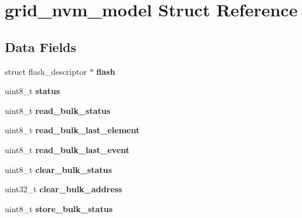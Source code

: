 \hypertarget{structgrid__nvm__model}{\section{grid\-\_\-nvm\-\_\-model Struct Reference}
\label{structgrid__nvm__model}
}
\subsection*{Data Fields}
\begin{DoxyCompactItemize}
\item 
\hypertarget{structgrid__nvm__model_ae7d77cc4c4cc9419b4253b375c141036}{struct flash\-\_\-descriptor $\ast$ {\bfseries flash}}\label{structgrid__nvm__model_ae7d77cc4c4cc9419b4253b375c141036}

\item 
\hypertarget{structgrid__nvm__model_ac6c48387083260cdc1d917ae482636f0}{uint8\-\_\-t {\bfseries status}}\label{structgrid__nvm__model_ac6c48387083260cdc1d917ae482636f0}

\item 
\hypertarget{structgrid__nvm__model_ac22ad810f7fbd10d99898a1b5cdd8c97}{uint8\-\_\-t {\bfseries read\-\_\-bulk\-\_\-status}}\label{structgrid__nvm__model_ac22ad810f7fbd10d99898a1b5cdd8c97}

\item 
\hypertarget{structgrid__nvm__model_a109ea9db1436ffe3a92567ef26f20069}{uint8\-\_\-t {\bfseries read\-\_\-bulk\-\_\-last\-\_\-element}}\label{structgrid__nvm__model_a109ea9db1436ffe3a92567ef26f20069}

\item 
\hypertarget{structgrid__nvm__model_a64aa7d5c44fe524ffb93de332703a9ef}{uint8\-\_\-t {\bfseries read\-\_\-bulk\-\_\-last\-\_\-event}}\label{structgrid__nvm__model_a64aa7d5c44fe524ffb93de332703a9ef}

\item 
\hypertarget{structgrid__nvm__model_ad9613155abfdae765ea64a6eb102220e}{uint8\-\_\-t {\bfseries clear\-\_\-bulk\-\_\-status}}\label{structgrid__nvm__model_ad9613155abfdae765ea64a6eb102220e}

\item 
\hypertarget{structgrid__nvm__model_a18b9acbd5cabe844654d48d529fa73a3}{uint32\-\_\-t {\bfseries clear\-\_\-bulk\-\_\-address}}\label{structgrid__nvm__model_a18b9acbd5cabe844654d48d529fa73a3}

\item 
\hypertarget{structgrid__nvm__model_a4919a7f7d15b91b0a962bcdc52da9705}{uint8\-\_\-t {\bfseries store\-\_\-bulk\-\_\-status}}\label{structgrid__nvm__model_a4919a7f7d15b91b0a962bcdc52da9705}


\end{DoxyCompactItemize}
